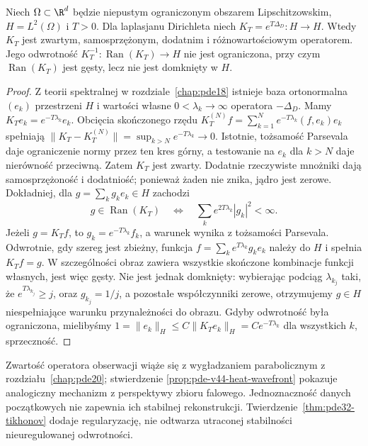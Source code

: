 \begin{stwierdzenie}
\label{prop:pde-v44-heat-inverse}
Niech $\Omega\subset\R^d$ będzie niepustym ograniczonym
obszarem Lipschitzowskim, $H=L^2(\Omega)$ i $T>0$.
Dla laplasjanu Dirichleta niech
$K_T=e^{T\Delta_D}:H\to H$. Wtedy $K_T$ jest
zwartym, samosprzężonym, dodatnim i różnowartościowym
operatorem. Jego odwrotność $K_T^{-1}:\operatorname{Ran}(K_T)\to H$
nie jest ograniczona, przy czym $\operatorname{Ran}(K_T)$
jest gęsty, lecz nie jest domknięty w $H$.
\end{stwierdzenie}
\begin{proof}
Z teorii spektralnej w rozdziale~\ref{chap:pde18}
istnieje baza ortonormalna $(e_k)$ przestrzeni $H$
i wartości własne $0<\lambda_k\to\infty$ operatora
$-\Delta_D$. Mamy $K_Te_k=e^{-T\lambda_k}e_k$.
Obcięcia skończonego rzędu
$K_T^{(N)}f=\sum_{k=1}^Ne^{-T\lambda_k}(f,e_k)e_k$
spełniają
$\|K_T-K_T^{(N)}\|=\sup_{k>N}e^{-T\lambda_k}\to0$.
Istotnie, tożsamość Parsevala daje ograniczenie normy
przez ten kres górny, a testowanie na $e_k$ dla $k>N$
daje nierówność przeciwną. Zatem $K_T$ jest zwarty. Dodatnie rzeczywiste
mnożniki dają samosprzężoność i dodatniość;
ponieważ żaden nie znika, jądro jest zerowe.
Dokładniej, dla $g=\sum_k g_ke_k\in H$ zachodzi
\[
 g\in\operatorname{Ran}(K_T)
 \quad\Longleftrightarrow\quad
 \sum_k e^{2T\lambda_k}|g_k|^2<\infty.
\]
Jeżeli $g=K_Tf$, to $g_k=e^{-T\lambda_k}f_k$,
a warunek wynika z tożsamości Parsevala.
Odwrotnie, gdy szereg jest zbieżny, funkcja
$f=\sum_k e^{T\lambda_k}g_ke_k$ należy do $H$
i spełnia $K_Tf=g$.
W szczególności obraz zawiera wszystkie skończone
kombinacje funkcji własnych, jest więc gęsty.
Nie jest jednak domknięty: wybierając podciąg
$\lambda_{k_j}$ taki, że $e^{T\lambda_{k_j}}\ge j$,
oraz $g_{k_j}=1/j$, a pozostałe współczynniki zerowe,
otrzymujemy $g\in H$ niespełniające warunku
przynależności do obrazu.
Gdyby odwrotność była ograniczona, mielibyśmy
$1=\|e_k\|_H\le C\|K_Te_k\|_H
=C e^{-T\lambda_k}$ dla wszystkich $k$, sprzeczność.
\end{proof}
\begin{uwaga}
Zwartość operatora obserwacji wiąże się z wygładzaniem
parabolicznym z rozdziału~\ref{chap:pde20}; stwierdzenie
\ref{prop:pde-v44-heat-wavefront} pokazuje analogiczny
mechanizm z perspektywy zbioru falowego.
Jednoznaczność danych początkowych nie zapewnia ich
stabilnej rekonstrukcji. Twierdzenie~\ref{thm:pde32-tikhonov}
dodaje regularyzację, nie odtwarza utraconej
stabilności nieuregulowanej odwrotności.
\end{uwaga}


